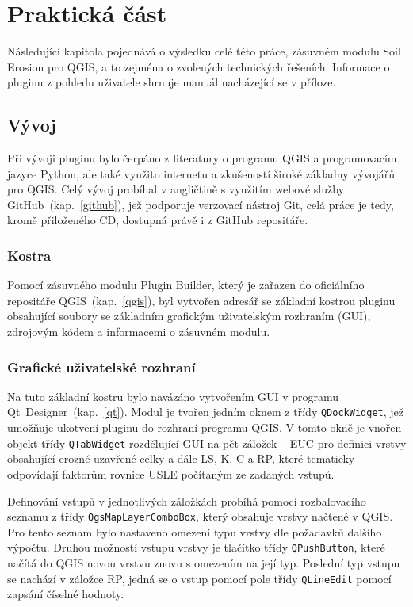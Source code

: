 \chapter{Praktická část}
\label{4-prakticka-cast} Následující kapitola pojednává o výsledku
celé této práce, zásuvném modulu Soil Erosion pro QGIS, a to zejména o
zvolených technických řešeních. Informace o pluginu z pohledu
uživatele shrnuje manuál nacházející se v příloze.
\section{Vývoj} Při vývoji pluginu bylo čerpáno z literatury o
programu QGIS\cite{masteringQgis} a programovacím jazyce
Python\cite{learningPython}\cite{diveIntoPython}, ale také využito
internetu a zkušeností široké základny vývojářů pro
QGIS\cite{stackexchange}. Celý vývoj probíhal v angličtině s využitím
webové služby GitHub~(kap.~\ref{github}), jež podporuje verzovací
nástroj Git, celá práce je tedy, kromě přiloženého CD, dostupná právě
i z GitHub repositáře\cite{mujgithub}.
\subsection{Kostra} Pomocí zásuvného modulu Plugin Builder, který je
zařazen do oficiálního repositáře QGIS~(kap.~\ref{qgis}), byl vytvořen
adresář se základní kostrou pluginu obsahující soubory se základním
grafickým uživatelským rozhraním (GUI), zdrojovým kódem a informacemi
o zásuvném modulu.
\subsection{Grafické uživatelské rozhraní} Na tuto základní kostru
bylo navázáno vytvořením GUI v programu
Qt~Designer~(kap.~\ref{qt}). Modul je tvořen jedním oknem z třídy
\texttt{QDockWidget}, jež umožňuje ukotvení pluginu do rozhraní
programu QGIS. V tomto okně je vnořen objekt třídy \texttt{QTabWidget}
rozdělující GUI na pět záložek – EUC pro definici vrstvy obsahující
erozně uzavřené celky a dále LS, K, C a RP, které tematicky odpovídají
faktorům rovnice USLE počítaným ze zadaných vstupů.

Definování vstupů v jednotlivých záložkách probíhá pomocí
rozbalovacího seznamu z třídy \texttt{QgsMapLayerComboBox}, který
obsahuje vrstvy načtené v QGIS. Pro tento seznam bylo nastaveno
omezení typu vrstvy dle požadavků dalšího výpočtu.  Druhou možností
vstupu vrstvy je tlačítko třídy \texttt{QPushButton}, které načítá do
QGIS novou vrstvu znovu s omezením na její typ. Poslední typ vstupu se
nachází v záložce RP, jedná se o vstup pomocí pole třídy
\texttt{QLineEdit} pomocí zapsání číselné hodnoty.

